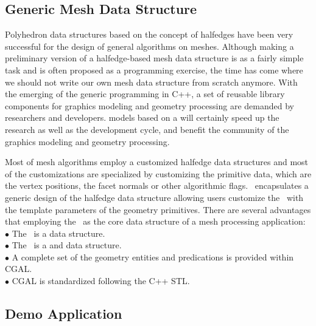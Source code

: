 \documentclass[letter,twocolumn]{article}
\begin{document}
\subsection*{Generic Mesh Data Structure}

Polyhedron data structures based on the concept of halfedges have been
very successful for the design of general algorithms on meshes.
Although making a preliminary version of a halfedge-based mesh data
structure is as a fairly simple task and is often proposed as a
programming exercise, the time has come where we should not write our
own mesh data structure from scratch anymore. With the emerging of the
generic programming in C++, a set of reusable library components for
graphics modeling and geometry processing are demanded by researchers
and developers.  models based on a
will certainly speed up the research as well as the development cycle,
and benefit the community of the graphics modeling and geometry
processing.

Most of mesh algorithms employ a customized halfedge data structures
and most of the customizations are specialized by customizing the
primitive data, which are the vertex positions, the facet normals or
other algorithmic flags. \cgalpoly\ encapsulates a generic design of
the halfedge data structure allowing users customize the \poly\ with
the template parameters of the geometry primitives. There are several
advantages that employing the \poly\ as the core data structure of a
mesh processing application: \\

\indent $\bullet$ The \poly\ is a  data structure.\\
\indent $\bullet$ The \poly\ is a  and  
data structure.\\
\indent $\bullet$ A complete set of the geometry entities and predications 
is provided within CGAL.\\
\indent $\bullet$ CGAL is standardized following the C++ STL.

\subsection*{Demo Application}
\end{document}
